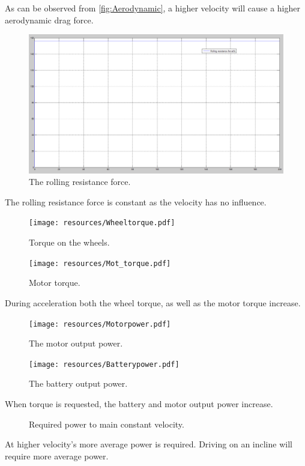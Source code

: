 \documentclass[final]{scrreprt} %
\begin{document}
As can be observed from \ref{fig:Aerodynamic}, a higher velocity will cause a higher aerodynamic drag force.
\begin{figure}[H]
\centering
\includegraphics[scale = 0.27]{resources/Rolling.png}
\caption{The rolling resistance force.}
\label{fig:Rolling}
\end{figure}
The rolling resistance force is constant as the velocity has no influence.
\begin{figure}[H]
\centering
\texttt{[image: resources/Wheeltorque.pdf]}
\caption{Torque on the wheels.}
\label{fig:Wheeltorque}
\end{figure}
\begin{figure}[H]
\centering
\texttt{[image: resources/Mot\_torque.pdf]}
\caption{Motor torque.}
\label{fig:Motortorque}
\end{figure}
During acceleration both the wheel torque, as well as the motor torque increase.
\begin{figure}[H]
\centering
\texttt{[image: resources/Motorpower.pdf]}
\caption{The motor output power.}
\label{fig:Motorpower}
\end{figure}
\begin{figure}[H]
\centering
\texttt{[image: resources/Batterypower.pdf]}
\caption{The battery output power.}
\label{fig:Batterypower}
\end{figure}
When torque is requested, the battery and motor output power increase.

\begin{figure}[H]
	\centering
	\newlength\figureheight 
	\newlength\figurewidth 
	\setlength\figureheight{4cm} 
	\setlength{}
	
	\caption{Required power to main constant velocity.}
	\label{fig:req_power}
\end{figure}
At higher velocity's more average power is required. Driving on an incline will require more average power.
\end{document}
